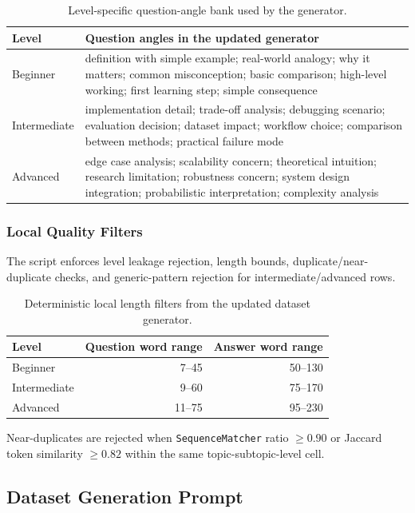 \documentclass[11pt,a4paper]{article}
\begin{document}
\begin{table}[H]
\centering
\small
\begin{tabular}{p{}p{}}
\toprule
\textbf{Level} & \textbf{Question angles in the updated generator} \\
\midrule
Beginner & definition with simple example; real-world analogy; why it matters; common misconception; basic comparison; high-level working; first learning step; simple consequence \\
Intermediate & implementation detail; trade-off analysis; debugging scenario; evaluation decision; dataset impact; workflow choice; comparison between methods; practical failure mode \\
Advanced & edge case analysis; scalability concern; theoretical intuition; research limitation; robustness concern; system design integration; probabilistic interpretation; complexity analysis \\
\bottomrule
\end{tabular}
\caption{Level-specific question-angle bank used by the generator.}
\end{table}

\subsubsection{Local Quality Filters}

The script enforces level leakage rejection, length bounds, duplicate/near-duplicate checks, and generic-pattern rejection for intermediate/advanced rows.

\begin{table}[H]
\centering
\begin{tabular}{lrr}
\toprule
\textbf{Level} & \textbf{Question word range} & \textbf{Answer word range} \\
\midrule
Beginner & 7--45 & 50--130 \\
Intermediate & 9--60 & 75--170 \\
Advanced & 11--75 & 95--230 \\
\bottomrule
\end{tabular}
\caption{Deterministic local length filters from the updated dataset generator.}
\end{table}

Near-duplicates are rejected when \texttt{SequenceMatcher} ratio $\ge 0.90$ or Jaccard token similarity $\ge 0.82$ within the same topic-subtopic-level cell.

\subsection{Dataset Generation Prompt}
\end{document}
